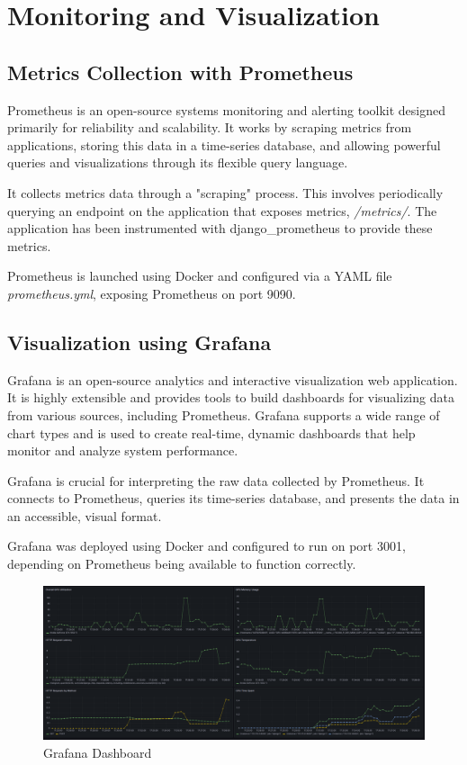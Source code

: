 
\section{Monitoring and Visualization}
\subsection{Metrics Collection with Prometheus}
Prometheus is an open-source systems monitoring and alerting toolkit designed primarily for reliability and scalability.
It works by scraping metrics from applications, storing this data in a time-series database, and allowing 
powerful queries and visualizations through its flexible query language.

It collects metrics data through a "scraping" process. This involves periodically querying an endpoint on 
the application that exposes metrics, \textit{/metrics/}. The application has been instrumented with 
django\_prometheus to provide these metrics.

Prometheus is launched using Docker and configured via a YAML file \textit{prometheus.yml}, exposing Prometheus 
on port 9090.


\subsection{Visualization using Grafana}
Grafana is an open-source analytics and interactive visualization web application. It is highly extensible and 
provides tools to build dashboards for visualizing data from various sources, including Prometheus. Grafana supports 
a wide range of chart types and is used to create real-time, dynamic dashboards that help monitor and analyze system 
performance.

Grafana is crucial for interpreting the raw data collected by Prometheus. It connects to Prometheus, queries its 
time-series database, and presents the data in an accessible, visual format.

Grafana was deployed using Docker and configured to run on port 3001, depending on Prometheus being available 
to function correctly.

\begin{figure}[h]
    \centering 
    \includegraphics[width=\textwidth]{figs/grafana-dashboard.png} 
    \caption{Grafana Dashboard}
    \label{fig:grafana-dashboard}
\end{figure}

